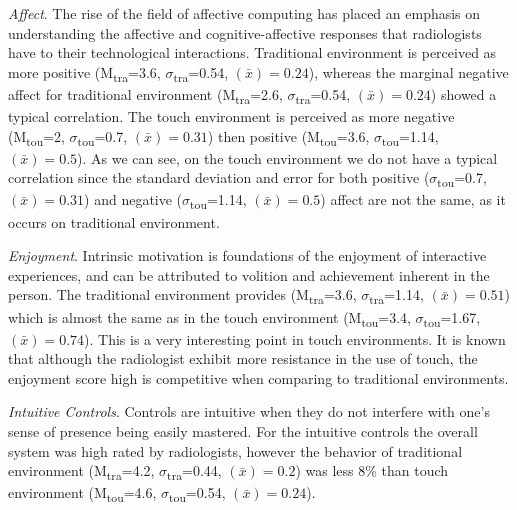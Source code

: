\documentclass{sigchi}
\begin{document}
\textit{Affect}. The rise of the field of affective computing has placed an emphasis on understanding the affective and cognitive-affective responses that radiologists have to their technological interactions. Traditional environment is perceived as more positive (M\textsubscript{tra}=3.6, $\sigma$\textsubscript{tra}=0.54, {}$\left({\bar x}\right)=0.24$), whereas the marginal negative affect for traditional environment (M\textsubscript{tra}=2.6, $\sigma$\textsubscript{tra}=0.54, {}$\left({\bar x}\right)=0.24$) showed a typical correlation. The touch environment is perceived as more negative (M\textsubscript{tou}=2, $\sigma$\textsubscript{tou}=0.7, {}$\left({\bar x}\right)=0.31$) then positive (M\textsubscript{tou}=3.6, $\sigma$\textsubscript{tou}=1.14, {}$\left({\bar x}\right)=0.5$). As we can see, on the touch environment we do not have a typical correlation since the standard deviation and error for both positive ($\sigma$\textsubscript{tou}=0.7, {}$\left({\bar x}\right)=0.31$) and negative ($\sigma$\textsubscript{tou}=1.14, {}$\left({\bar x}\right)=0.5$) affect are not the same, as it occurs on traditional environment.

\textit{Enjoyment}. Intrinsic motivation is foundations of the enjoyment of interactive experiences, and can be attributed to volition and achievement inherent in the person. The traditional environment provides (M\textsubscript{tra}=3.6, $\sigma$\textsubscript{tra}=1.14, {}$\left({\bar x}\right)=0.51$) which is almost the same as in the touch environment (M\textsubscript{tou}=3.4, $\sigma$\textsubscript{tou}=1.67, {}$\left({\bar x}\right)=0.74$). This is a very interesting point in touch environments. It is known that although the radiologist exhibit more resistance in the use of touch, the enjoyment score high is competitive when comparing to traditional environments.
 
\textit{Intuitive Controls}. Controls are intuitive when they do not interfere with one's sense of presence being easily mastered. For the intuitive controls the overall system was high rated by radiologists, however the behavior of traditional environment (M\textsubscript{tra}=4.2, $\sigma$\textsubscript{tra}=0.44, {}$\left({\bar x}\right)=0.2$) was less 8\% than touch environment (M\textsubscript{tou}=4.6, $\sigma$\textsubscript{tou}=0.54, {}$\left({\bar x}\right)=0.24$).
\end{document}
